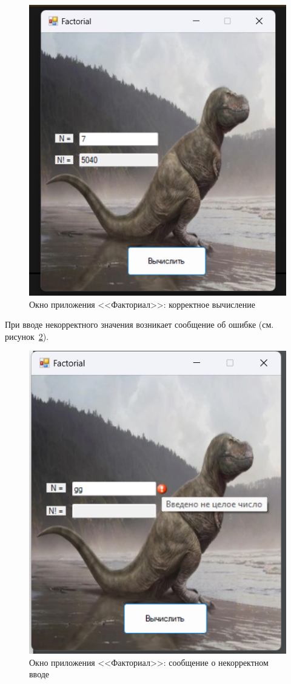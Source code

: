 \documentclass[bachelor, och, pract, times]{SCWorks}
\begin{document}
\begin{figure}[H]
    \centering
    \includegraphics[scale=0.7]{Скрины/Снимок экрана 2025-01-03 203634.png}
    \caption{Окно приложения <<Факториал>>: корректное вычисление}\label{fig:fact-03}
\end{figure}

При вводе некорректного значения возникает сообщение об ошибке (см. рисунок~\ref{fig:fact-04}).
\begin{figure}[H]
    \centering
    \includegraphics[scale=0.7]{Скрины/Снимок экрана 2025-01-03 203727.png}
    \caption{Окно приложения <<Факториал>>: сообщение о некорректном вводе}\label{fig:fact-04}
\end{figure}
\end{document}
